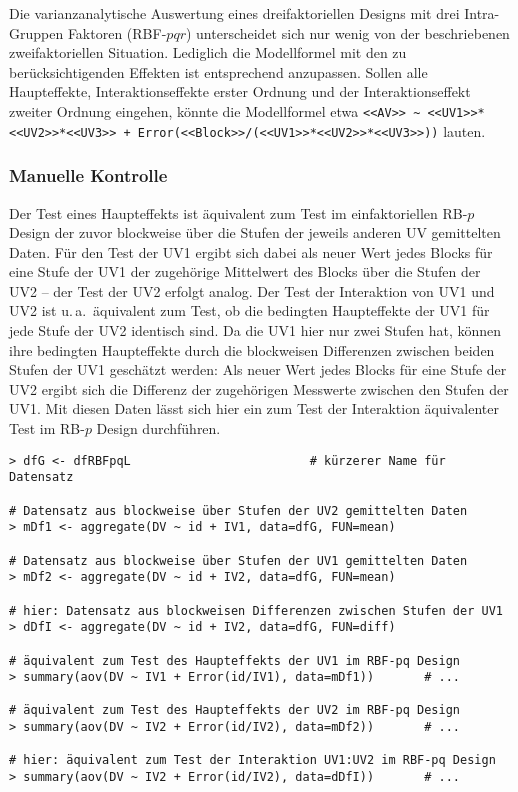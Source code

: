 Die varianzanalytische Auswertung eines dreifaktoriellen Designs mit drei Intra-Gruppen Faktoren (RBF-$pqr$) unterscheidet sich nur wenig von der beschriebenen zweifaktoriellen Situation. Lediglich die Modellformel mit den zu berücksichtigenden Effekten ist entsprechend anzupassen. Sollen alle Haupteffekte, Interaktionseffekte erster Ordnung und der Interaktionseffekt zweiter Ordnung eingehen, könnte die Modellformel etwa \lstinline!<<AV>> ~ <<UV1>>*<<UV2>>*<<UV3>> + Error(<<Block>>/(<<UV1>>*<<UV2>>*<<UV3>>))! lauten.

\subsubsection{Manuelle Kontrolle}

Der Test eines Haupteffekts ist äquivalent zum Test im einfaktoriellen RB-$p$ Design der zuvor blockweise über die Stufen der jeweils anderen UV gemittelten Daten. Für den Test der UV1 ergibt sich dabei als neuer Wert jedes Blocks für eine Stufe der UV1 der zugehörige Mittelwert des Blocks über die Stufen der UV2 -- der Test der UV2 erfolgt analog. Der Test der Interaktion von UV1 und UV2 ist u.\,a.\ äquivalent zum Test, ob die bedingten Haupteffekte der UV1 für jede Stufe der UV2 identisch sind. Da die UV1 hier nur zwei Stufen hat, können ihre bedingten Haupteffekte durch die blockweisen Differenzen zwischen beiden Stufen der UV1 geschätzt werden: Als neuer Wert jedes Blocks für eine Stufe der UV2 ergibt sich die Differenz der zugehörigen Messwerte zwischen den Stufen der UV1. Mit diesen Daten lässt sich hier ein zum Test der Interaktion äquivalenter Test im RB-$p$ Design durchführen.
\begin{lstlisting}
> dfG <- dfRBFpqL                         # kürzerer Name für Datensatz

# Datensatz aus blockweise über Stufen der UV2 gemittelten Daten
> mDf1 <- aggregate(DV ~ id + IV1, data=dfG, FUN=mean)

# Datensatz aus blockweise über Stufen der UV1 gemittelten Daten
> mDf2 <- aggregate(DV ~ id + IV2, data=dfG, FUN=mean)

# hier: Datensatz aus blockweisen Differenzen zwischen Stufen der UV1
> dDfI <- aggregate(DV ~ id + IV2, data=dfG, FUN=diff)

# äquivalent zum Test des Haupteffekts der UV1 im RBF-pq Design
> summary(aov(DV ~ IV1 + Error(id/IV1), data=mDf1))       # ...

# äquivalent zum Test des Haupteffekts der UV2 im RBF-pq Design
> summary(aov(DV ~ IV2 + Error(id/IV2), data=mDf2))       # ...

# hier: äquivalent zum Test der Interaktion UV1:UV2 im RBF-pq Design
> summary(aov(DV ~ IV2 + Error(id/IV2), data=dDfI))       # ...
\end{lstlisting}


